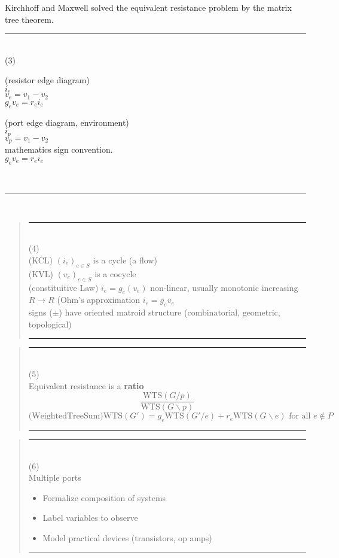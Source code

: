 \documentclass{article}
\begin{document}
Kirchhoff and Maxwell solved the equivalent resistance problem
by the matrix tree theorem.


\rule{\textwidth}{3pt}\\
(3)\\
\begin{minipage}{.4\textwidth}
(resistor edge diagram)\\
$i_e$\\
$v_e=v_1-v_2$\\
$g_ev_e=r_ei_e$
\end{minipage}
\begin{minipage}{.4\textwidth}
(port edge diagram, environment)\\
$i_p$\\
$v_p=v_1-v_2$\\
mathematics sign convention.\\
$g_ev_e=r_ei_e$
\end{minipage}\\
\rule{\textwidth}{3pt}\\


\pagebreak[3] \begin{quote}\rule{\textwidth}{3pt}\\
(4)\\
(KCL) $(i_e)_{e\in S}$ is a cycle (a flow)\\
(KVL) $(v_e)_{e\in S}$ is a cocycle\\
(constituitive Law) $i_e=g_e(v_e)$
non-linear, usually monotonic increasing $R\rightarrow R$ 
(Ohm's approximation $i_e=g_ev_e$\\
signs ($\pm$) have oriented matroid structure
(combinatorial, geometric, topological)\\
\rule{\textwidth}{3pt}
\end{quote}

\pagebreak[3] \begin{quote}\rule{\textwidth}{3pt}\\
(5)\\
Equivalent resistance is a \textbf{ratio}
\[
\frac{\mbox{WTS}(G/p)}
{\mbox{WTS}(G\backslash p)}
\]
\[
\mbox{(WeightedTreeSum)}\mbox{WTS}(G') =
g_e \mbox{WTS}(G'/e) + r_e \mbox{WTS} (G \backslash e)
\text{\ for all\ }e \not\in P
\]
\rule{\textwidth}{3pt}
\end{quote}


\pagebreak[3] \begin{quote}\rule{\textwidth}{3pt}\\
(6)\\
Multiple ports

\begin{itemize}
\item
Formalize composition of systems
\item
Label variables to observe
\item
Model practical devices (transistors, op amps)
\end{itemize}

\rule{\textwidth}{3pt}
\end{quote}
\end{document}
